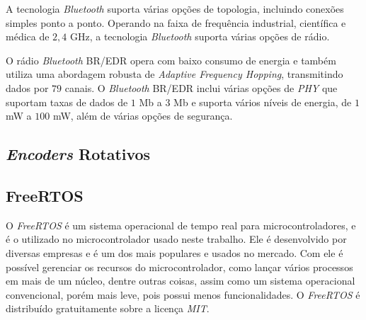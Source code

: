A  tecnologia \emph{Bluetooth}  suporta várias opções de topologia, incluindo conexões simples ponto a ponto. Operando na faixa de frequência industrial, científica e médica de $2,4$ GHz, a tecnologia \emph{Bluetooth} suporta várias opções de rádio.
    
O rádio \emph{Bluetooth} BR/EDR opera com baixo consumo de energia e também utiliza uma abordagem robusta de \textit{Adaptive Frequency Hopping}, transmitindo dados por $79$ canais. O \textit{Bluetooth} BR/EDR inclui várias opções de \textit{PHY} que suportam taxas de dados de $1$ Mb a $3$ Mb e suporta vários níveis de energia, de $1$mW a $100$ mW, além de várias opções de segurança.


\subsection{\textit{Encoders} Rotativos}



\subsection{FreeRTOS}
O \emph{FreeRTOS} é um sistema operacional de tempo real para microcontroladores, e é o utilizado no microcontrolador usado neste trabalho. Ele é desenvolvido por diversas empresas e é um dos mais populares e usados no mercado. Com ele é possível gerenciar os recursos do microcontrolador, como lançar vários processos em mais de um núcleo, dentre outras coisas, assim como um sistema operacional convencional, porém mais leve, pois possui menos funcionalidades. O \emph{FreeRTOS} é distribuído gratuitamente sobre a licença \textit{MIT}.

